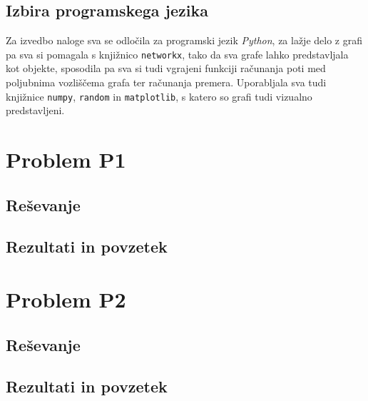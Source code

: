 \documentclass[a4paper, 12 pt]{article}
\begin{document}
\subsection{Izbira programskega jezika}

Za izvedbo naloge sva se odločila za programski jezik \textit{Python}, za lažje delo z grafi pa sva si pomagala s knjižnico \texttt{networkx}, tako da sva grafe lahko predstavljala kot objekte, sposodila pa sva si tudi vgrajeni funkciji računanja poti med poljubnima vozliščema grafa ter računanja premera. Uporabljala sva tudi knjižnice \texttt{numpy}, \texttt{random} in \texttt{matplotlib}, s katero so grafi tudi vizualno predstavljeni.



\pagebreak

\section{Problem P1}

\subsection{Reševanje}

\subsection{Rezultati in povzetek}

\pagebreak

\section{Problem P2}

\subsection{Reševanje}

\subsection{Rezultati in povzetek}
\end{document}

